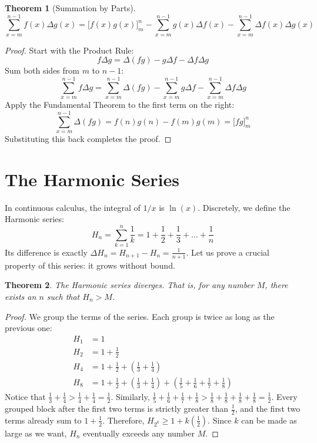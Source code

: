\documentclass[12pt]{article}
\newtheorem{theorem}{Theorem}
\begin{document}
\begin{theorem}[Summation by Parts]
\[ \sum_{x=m}^{n-1} f(x) \Delta g(x) = \Big[ f(x)g(x) \Big]_m^n - \sum_{x=m}^{n-1} g(x) \Delta f(x) - \sum_{x=m}^{n-1} \Delta f(x) \Delta g(x) \]
\end{theorem}

\begin{proof}
Start with the Product Rule:
\[ f \Delta g = \Delta(fg) - g \Delta f - \Delta f \Delta g \]
Sum both sides from $m$ to $n-1$:
\[ \sum_{x=m}^{n-1} f \Delta g = \sum_{x=m}^{n-1} \Delta(fg) - \sum_{x=m}^{n-1} g \Delta f - \sum_{x=m}^{n-1} \Delta f \Delta g \]
Apply the Fundamental Theorem to the first term on the right:
\[ \sum_{x=m}^{n-1} \Delta(fg) = f(n)g(n) - f(m)g(m) = \Big[ fg \Big]_m^n \]
Substituting this back completes the proof.
\end{proof}

\section{The Harmonic Series}

In continuous calculus, the integral of $1/x$ is $\ln(x)$. Discretely, we define the Harmonic series:
\[ H_n = \sum_{k=1}^n \frac{1}{k} = 1 + \frac{1}{2} + \frac{1}{3} + \dots + \frac{1}{n} \]
Its difference is exactly $\Delta H_n = H_{n+1} - H_n = \frac{1}{n+1}$. Let us prove a crucial property of this series: it grows without bound.

\begin{theorem}
The Harmonic series diverges. That is, for any number $M$, there exists an $n$ such that $H_n > M$.
\end{theorem}

\begin{proof}
We group the terms of the series. Each group is twice as long as the previous one:
\begin{align*}
    H_1 &= 1 \\
    H_2 &= 1 + \frac{1}{2} \\
    H_4 &= 1 + \frac{1}{2} + \left(\frac{1}{3} + \frac{1}{4}\right) \\
    H_8 &= 1 + \frac{1}{2} + \left(\frac{1}{3} + \frac{1}{4}\right) + \left(\frac{1}{5} + \frac{1}{6} + \frac{1}{7} + \frac{1}{8}\right)
\end{align*}
Notice that $\frac{1}{3} + \frac{1}{4} > \frac{1}{4} + \frac{1}{4} = \frac{1}{2}$.
Similarly, $\frac{1}{5} + \frac{1}{6} + \frac{1}{7} + \frac{1}{8} > \frac{1}{8} + \frac{1}{8} + \frac{1}{8} + \frac{1}{8} = \frac{1}{2}$.
Every grouped block after the first two terms is strictly greater than $\frac{1}{2}$, and the first two terms already sum to $1+\frac12$. 
Therefore, $H_{2^k} \ge 1 + k\left(\frac{1}{2}\right)$. Since $k$ can be made as large as we want, $H_n$ eventually exceeds any number $M$.
\end{proof}
\end{document}
